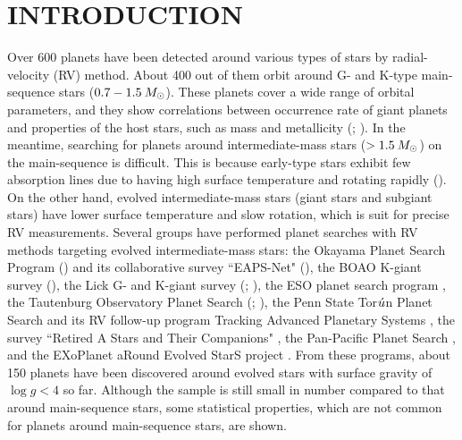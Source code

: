 \documentclass[]{pasj01}
\begin{document}
\section{INTRODUCTION}
Over 600 planets have been detected around various types of stars by radial-velocity (RV) method.
About 400 out of them orbit around G- and K-type main-sequence stars ($0.7-1.5\>M_{\Sol}$).
These planets cover a wide range of orbital parameters, and they show correlations between occurrence rate of giant planets and properties of the host stars, such as mass \citep{Johnson2007} and metallicity (\cite{Gonzalez1997}; \cite{Fischer2005}). 
In the meantime, searching for planets around intermediate-mass stars ($>1.5\>M_{\Sol}$) on the main-sequence is difficult.
This is because early-type stars exhibit few absorption lines due to having high surface temperature and rotating rapidly (\cite{Lagrange2009}).
On the other hand, evolved intermediate-mass stars (giant stars and subgiant stars) have lower surface temperature and slow rotation, which is suit for precise RV measurements.
Several groups have performed planet searches with RV methods targeting evolved intermediate-mass stars: 
the Okayama Planet Search Program (\cite{Sato2005}) and its collaborative survey ``EAPS-Net" (\cite{Izumiura2005}), 
the BOAO K-giant survey (\cite{Han2010}), 
the Lick G- and K-giant survey (\cite{Frink2001}; \cite{Hekker2006}), 
the ESO planet search program \citep{Setiawan2003}, 
the Tautenburg Observatory Planet Search (\cite{Hatzes2005}; \cite{Dollinger2007}), 
the Penn State Tor${\rm \acute{u}}$n Planet Search \citep{Niedzielski2007} and its RV follow-up program Tracking Advanced Planetary Systems \citep{Niedzielski2015},
the survey ``Retired A Stars and Their Companions" \citep{Johnson2006},
the Pan-Pacific Planet Search \citep{Wittenmyer2011},
and the EXoPlanet aRound Evolved StarS project \citep{Jones2011}.
From these programs, about 150 planets have been discovered around evolved stars with surface gravity of $\log g<4$ so far.
Although the sample is still small in number compared to that around main-sequence stars, some statistical properties, which are not common for planets around main-sequence stars, are shown.
\end{document}
